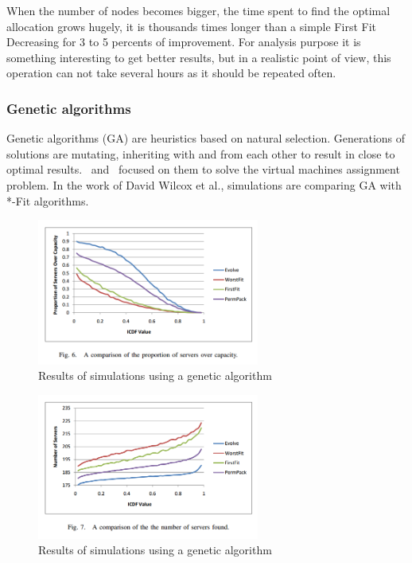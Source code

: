 When the number of nodes becomes bigger, the time spent to find the optimal
allocation grows hugely, it is thousands times longer than a simple First Fit
Decreasing for 3 to 5 percents of improvement. For analysis purpose it is
something interesting to get better results, but in a realistic point of view,
this operation can not take several hours as it should be repeated often.

\subsubsection{Genetic algorithms}

Genetic algorithms (GA) are heuristics based on natural selection. Generations
of solutions are mutating, inheriting with and from each other to result in
close to optimal results.~\cite{algoGenetics1} and~\cite{algoGenetics2}
focused on them to solve the virtual machines assignment problem. In the work
of David Wilcox et al.\cite{algoGenetics1}, simulations are comparing GA with
*-Fit algorithms.

\begin{figure}[b!]
\begin{center}
	\includegraphics[width=0.65\textwidth]{./Images/geneticperf1.png}
	\caption{Results of simulations using a genetic algorithm\cite{algoGenetics1}}
\end{center}
\end{figure}

\begin{figure}[H]
\begin{center}
	\includegraphics[width=0.65\textwidth]{./Images/geneticperf2.png}
	\caption{Results of simulations using a genetic algorithm\cite{algoGenetics1}}
\end{center}
\end{figure}

